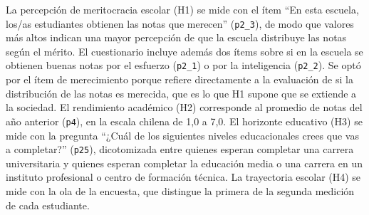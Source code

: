 \documentclass[
  spanish,
  a4paper,
  oneside]{scrbook}
\begin{document}
La percepción de meritocracia escolar (H1) se mide con el ítem ``En esta
escuela, los/as estudiantes obtienen las notas que merecen''
(\texttt{p2\_3}), de modo que valores más altos indican una mayor
percepción de que la escuela distribuye las notas según el mérito. El
cuestionario incluye además dos ítems sobre si en la escuela se obtienen
buenas notas por el esfuerzo (\texttt{p2\_1}) o por la inteligencia
(\texttt{p2\_2}). Se optó por el ítem de merecimiento porque refiere
directamente a la evaluación de si la distribución de las notas es
merecida, que es lo que H1 supone que se extiende a la sociedad. El
rendimiento académico (H2) corresponde al promedio de notas del año
anterior (\texttt{p4}), en la escala chilena de 1,0 a 7,0. El horizonte
educativo (H3) se mide con la pregunta ``¿Cuál de los siguientes niveles
educacionales crees que vas a completar?'' (\texttt{p25}), dicotomizada
entre quienes esperan completar una carrera universitaria y quienes
esperan completar la educación media o una carrera en un instituto
profesional o centro de formación técnica. La trayectoria escolar (H4)
se mide con la ola de la encuesta, que distingue la primera de la
segunda medición de cada estudiante.
\end{document}
